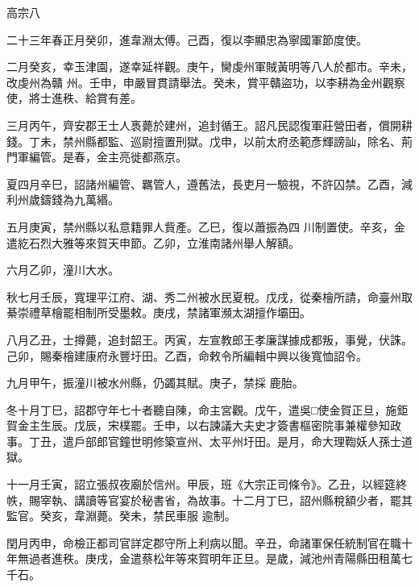 
\begin{pinyinscope}

 高宗八



 二十三年春正月癸卯，進韋淵太傅。己酉，復以李顯忠為寧國軍節度使。



 二月癸亥，幸玉津園，遂幸延祥觀。庚午，臠虔州軍賊黃明等八人於都市。辛未，改虔州為贛
 州。壬申，申嚴冒貫請舉法。癸未，賞平贛盜功，以李耕為金州觀察使，將士進秩、給賞有差。



 三月丙午，齊安郡王士人褭薨於建州，追封循王。詔凡民認復軍莊營田者，償開耕錢。丁未，禁州縣都監、巡尉擅置刑獄。戊申，以前太府丞範彥輝謗訕，除名、荊門軍編管。是春，金主亮徙都燕京。



 夏四月辛巳，詔諸州編管、羈管人，遵舊法，長吏月一驗視，不許囚禁。乙酉，減利州歲鑄錢為九萬緡。



 五月庚寅，禁州縣以私意籍罪人貲產。乙巳，復以蕭振為四
 川制置使。辛亥，金遣紇石烈大雅等來賀天申節。乙卯，立淮南諸州舉人解額。



 六月乙卯，潼川大水。



 秋七月壬辰，寬理平江府、湖、秀二州被水民夏稅。戊戌，從秦檜所請，命臺州取綦崇禮草檜罷相制所受墨敕。庚戌，禁諸軍瀕太湖擅作壩田。



 八月乙丑，士撙薨，追封韶王。丙寅，左宣教郎王孝廉謀據成都叛，事覺，伏誅。己卯，賜秦檜建康府永豐圩田。乙酉，命敕令所編輯中興以後寬恤詔令。



 九月甲午，振潼川被水州縣，仍蠲其賦。庚子，禁採
 鹿胎。



 冬十月丁巳，詔郡守年七十者聽自陳，命主宮觀。戊午，遣吳□使金賀正旦，施鉅賀金主生辰。戊辰，宋樸罷。壬申，以右諫議大夫史才簽書樞密院事兼權參知政事。丁丑，遣戶部郎官鐘世明修築宣州、太平州圩田。是月，命大理鞫妖人孫士道獄。



 十一月壬寅，詔立張叔夜廟於信州。甲辰，班《大宗正司條令》。乙丑，以經筵終帙，賜宰執、講讀等官宴於秘書省，為故事。十二月丁巳，詔州縣稅額少者，罷其監官。癸亥，韋淵薨。癸未，禁民車服
 逾制。



 閏月丙申，命檢正都司官詳定郡守所上利病以聞。辛丑，命諸軍保任統制官在職十年無過者進秩。庚戌，金遣蔡松年等來賀明年正旦。是歲，減池州青陽縣田租萬七千石。




\end{pinyinscope}
